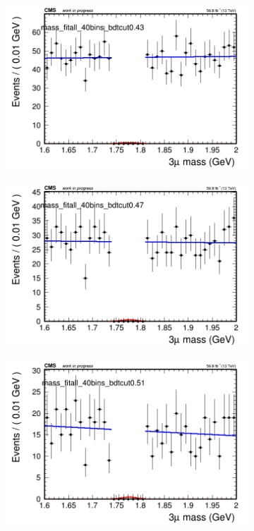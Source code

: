 \begin{figure}[H]
\begin{subfigure}{0.2\textwidth}
        \caption{}
    \end{subfigure}
    \begin{subfigure}{0.2\textwidth}
        \includegraphics[width=\textwidth]{unfixed_exp/plots/all/massfit_all_40bins_bdtcut0.43.png}
        \caption{}
    \end{subfigure}
    \begin{subfigure}{0.2\textwidth}
        \includegraphics[width=\textwidth]{unfixed_exp/plots/all/massfit_all_40bins_bdtcut0.47.png}
        \caption{}
    \end{subfigure}
    \begin{subfigure}{0.2\textwidth}
        \includegraphics[width=\textwidth]{unfixed_exp/plots/all/massfit_all_40bins_bdtcut0.51.png}

\end{subfigure}
\end{figure}
